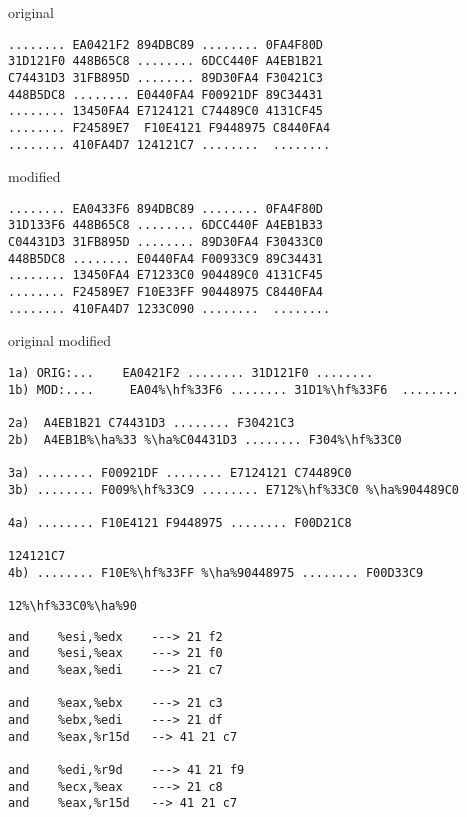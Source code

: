 \documentclass[conference]{IEEEtran}
\begin{document}
original
\begin{lstlisting}[style=hex]
........ EA0421F2 894DBC89 ........ 0FA4F80D
31D121F0 448B65C8 ........ 6DCC440F A4EB1B21
C74431D3 31FB895D ........ 89D30FA4 F30421C3
448B5DC8 ........ E0440FA4 F00921DF 89C34431
........ 13450FA4 E7124121 C74489C0 4131CF45
........ F24589E7  F10E4121 F9448975 C8440FA4
........ 410FA4D7 124121C7 ........  ........
\end{lstlisting}

modified
\begin{lstlisting}[style=hex]
........ EA0433F6 894DBC89 ........ 0FA4F80D 
31D133F6 448B65C8 ........ 6DCC440F A4EB1B33
C04431D3 31FB895D ........ 89D30FA4 F30433C0 
448B5DC8 ........ E0440FA4 F00933C9 89C34431
........ 13450FA4 E71233C0 904489C0 4131CF45
........ F24589E7 F10E33FF 90448975 C8440FA4 
........ 410FA4D7 1233C090 ........  ........
\end{lstlisting}



original
modified
\newcommand{\hf}{\makebox[0pt][l]{\color{green}\rule[-3pt]{0.08\linewidth}{11pt}}}
\newcommand{\ha}{\makebox[0pt][l]{\color{green}\rule[-3pt]{0.04\linewidth}{11pt}}}

\begin{lstlisting}[style=hex,escapechar=\%]
1a) ORIG:...    EA0421F2 ........ 31D121F0 ........
1b) MOD:....     EA04%\hf%33F6 ........ 31D1%\hf%33F6  ........

2a)  A4EB1B21 C74431D3 ........ F30421C3
2b)  A4EB1B%\ha%33 %\ha%C04431D3 ........ F304%\hf%33C0

3a) ........ F00921DF ........ E7124121 C74489C0
3b) ........ F009%\hf%33C9 ........ E712%\hf%33C0 %\ha%904489C0 

4a) ........ F10E4121 F9448975 ........ F00D21C8

124121C7
4b) ........ F10E%\hf%33FF %\ha%90448975 ........ F00D33C9

12%\hf%33C0%\ha%90
\end{lstlisting}

\clearpage

\begin{lstlisting}[style=asm]
and    %esi,%edx    ---> 21 f2 
and    %esi,%eax    ---> 21 f0
and    %eax,%edi    ---> 21 c7 

and    %eax,%ebx    ---> 21 c3
and    %ebx,%edi    ---> 21 df 
and    %eax,%r15d   --> 41 21 c7

and    %edi,%r9d    ---> 41 21 f9
and    %ecx,%eax    ---> 21 c8
and    %eax,%r15d   --> 41 21 c7
\end{lstlisting}
\end{document}
